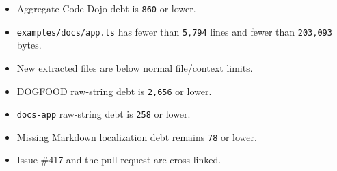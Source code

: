 \begin{itemize}
\tightlist
\item
  Aggregate Code Dojo debt is \texttt{8\allowbreak{}6\allowbreak{}0} or lower.
\item
  \texttt{e\allowbreak{}x\allowbreak{}a\allowbreak{}m\allowbreak{}p\allowbreak{}l\allowbreak{}e\allowbreak{}s\allowbreak{}/\allowbreak{}d\allowbreak{}o\allowbreak{}c\allowbreak{}s\allowbreak{}/\allowbreak{}a\allowbreak{}p\allowbreak{}p\allowbreak{}.\allowbreak{}t\allowbreak{}s} has fewer than \texttt{5\allowbreak{},\allowbreak{}7\allowbreak{}9\allowbreak{}4} lines and fewer than \texttt{2\allowbreak{}0\allowbreak{}3\allowbreak{},\allowbreak{}0\allowbreak{}9\allowbreak{}3} bytes.
\item
  New extracted files are below normal file/context limits.
\item
  DOGFOOD raw-string debt is \texttt{2\allowbreak{},\allowbreak{}6\allowbreak{}5\allowbreak{}6} or lower.
\item
  \texttt{d\allowbreak{}o\allowbreak{}c\allowbreak{}s\allowbreak{}-\allowbreak{}a\allowbreak{}p\allowbreak{}p} raw-string debt is \texttt{2\allowbreak{}5\allowbreak{}8} or lower.
\item
  Missing Markdown localization debt remains \texttt{7\allowbreak{}8} or lower.
\item
  Issue \#417 and the pull request are cross-linked.
\end{itemize}

